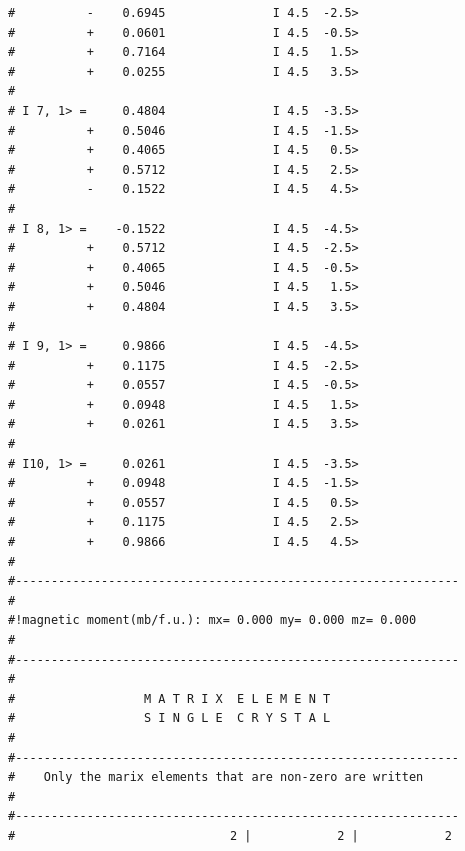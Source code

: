 \begin{enumerate}
{\begin{verbatim}
#          -    0.6945               I 4.5  -2.5>              
#          +    0.0601               I 4.5  -0.5>              
#          +    0.7164               I 4.5   1.5>              
#          +    0.0255               I 4.5   3.5>              
#                                                              
# I 7, 1> =     0.4804               I 4.5  -3.5>              
#          +    0.5046               I 4.5  -1.5>              
#          +    0.4065               I 4.5   0.5>              
#          +    0.5712               I 4.5   2.5>              
#          -    0.1522               I 4.5   4.5>              
#                                                              
# I 8, 1> =    -0.1522               I 4.5  -4.5>              
#          +    0.5712               I 4.5  -2.5>              
#          +    0.4065               I 4.5  -0.5>              
#          +    0.5046               I 4.5   1.5>              
#          +    0.4804               I 4.5   3.5>              
#                                                              
# I 9, 1> =     0.9866               I 4.5  -4.5>              
#          +    0.1175               I 4.5  -2.5>              
#          +    0.0557               I 4.5  -0.5>              
#          +    0.0948               I 4.5   1.5>              
#          +    0.0261               I 4.5   3.5>              
#                                                              
# I10, 1> =     0.0261               I 4.5  -3.5>              
#          +    0.0948               I 4.5  -1.5>              
#          +    0.0557               I 4.5   0.5>              
#          +    0.1175               I 4.5   2.5>              
#          +    0.9866               I 4.5   4.5>              
#                                                              
#-------------------------------------------------------------- 
#
#!magnetic moment(mb/f.u.): mx= 0.000 my= 0.000 mz= 0.000
#
#-------------------------------------------------------------- 
#                                                              
#                  M A T R I X  E L E M E N T                  
#                  S I N G L E  C R Y S T A L                    
#                                                              
#--------------------------------------------------------------
#    Only the marix elements that are non-zero are written     
#                                                              
#--------------------------------------------------------------
#                              2 |            2 |            2 

\end{verbatim}}
\end{enumerate}
